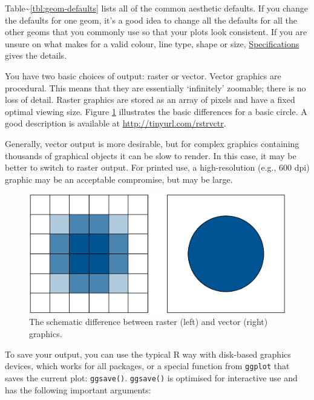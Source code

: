 Table\textasciitilde{}\ref{tbl:geom-defaults} lists all of the common
aesthetic defaults. If you change the defaults for one geom, it's a good
idea to change all the defaults for all the other geoms that you
commonly use so that your plots look consistent. If you are unsure on
what makes for a valid colour, line type, shape or size,
\hyperref[cha:specifications]{Specifications} gives the details.


You have two basic choices of output: raster or vector. Vector graphics
are procedural. This means that they are essentially `infinitely'
zoomable; there is no loss of detail. Raster graphics are stored as an
array of pixels and have a fixed optimal viewing size. Figure
\ref{fig:vector-raster} illustrates the basic differences for a basic
circle. A good description is available at
\url{http://tinyurl.com/rstrvctr}.  

Generally, vector output is more desirable, but for complex graphics
containing thousands of graphical objects it can be slow to render. In
this case, it may be better to switch to raster output. For printed use,
a high-resolution (e.g., 600 dpi) graphic may be an acceptable
compromise, but may be large.

\begin{figure}[htbp]
  \centering
    \includegraphics[width= 0.5\linewidth]{diagrams/vector-raster}
  \caption{The schematic difference between raster (left) and vector (right) graphics. }
  \label{fig:vector-raster}
\end{figure}

To save your output, you can use the typical R way with disk-based
graphics devices, which works for all packages, or a special function
from \texttt{ggplot} that saves the current plot: \texttt{ggsave()}.
\texttt{ggsave()} is optimised for interactive use and has the following
important arguments: 

